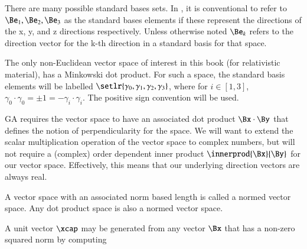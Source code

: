 There are many possible standard bases sets.  In , it is conventional to refer to \( \Be_1, \Be_2, \Be_3 \) as the standard bases elements if these represent the directions of the x, y, and z directions respectively.  Unless otherwise noted \( \Be_k \) refers to the direction vector for the k-th direction in a standard basis for that space.

The only non-Euclidean vector space of interest in this book (for relativistic material), has a Minkowski dot product.  For such a space, the standard basis elements will be labelled \( \setlr{ \gamma_0, \gamma_1, \gamma_2, \gamma_3 } \), where for \( i \in [1,3] \), \( \gamma_0 \cdot \gamma_0 = \pm 1 = -\gamma_i \cdot \gamma_i \).  The positive sign convention will be used.

GA requires the vector space to have an associated
dot product \( \Bx \cdot \By \) that 
defines the notion of perpendicularity for the space.  We will want to extend the scalar multiplication operation of the vector 
space to complex numbers, but 
will not require a (complex) order dependent inner product \( \innerprod{\Bx}{\By} \) for our vector space.
Effectively, this means that our underlying direction vectors are always real.





A vector space with an associated norm based length is called a normed vector space.  Any dot product space is also a normed vector space.


A unit vector \( \xcap \) may be generated from any vector \( \Bx \) that has a non-zero squared norm by computing

